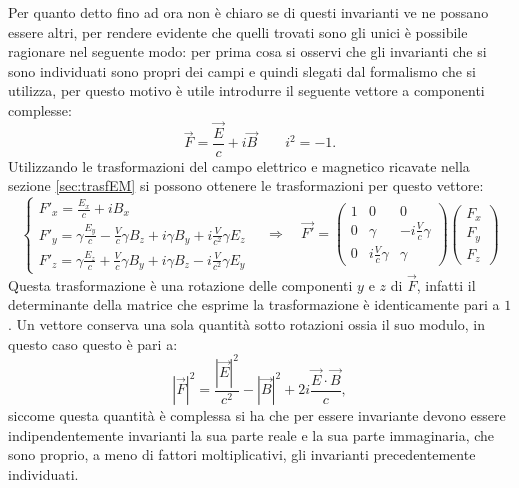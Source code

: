 Per quanto detto fino ad ora non è chiaro se di questi invarianti ve ne possano essere altri, per rendere evidente che quelli trovati sono gli unici è possibile ragionare nel seguente modo: per prima cosa si osservi che gli invarianti che si sono individuati sono propri dei campi e quindi slegati dal formalismo che si utilizza, per questo motivo è utile introdurre il seguente vettore a componenti complesse:
\begin{equation*}
    \vec{F}=\frac{\vec E}{c} +i\vec B \qquad i^2=-1.
\end{equation*}
Utilizzando le trasformazioni del campo elettrico e magnetico ricavate nella sezione \ref{sec:trasfEM} si possono ottenere le trasformazioni per questo vettore:
\begin{equation*}
    \begin{cases}
        F'_x=\frac{E_x}{c}+iB_x\\
        F'_y=\gamma\frac{E_y}{c}-\frac{V}{c}\gamma B_z+i\gamma B_y+i\frac{V}{c^2}\gamma E_z\\
        F'_z=\gamma\frac{E_z}{c}+\frac{V}{c}\gamma B_y+i\gamma B_z-i\frac{V}{c^2}\gamma E_y
    \end{cases}
    \quad\Rightarrow\quad
    \vec{F'}=\begin{pmatrix}
        1&0&0\\
        0&\gamma&-i\frac{V}{c}\gamma\\
        0&i\frac{V}{c}\gamma&\gamma
    \end{pmatrix}
    \begin{pmatrix}
        F_x\\F_y\\F_z
    \end{pmatrix}
\end{equation*}
Questa trasformazione è una rotazione delle componenti $y$ e $z$ di $\vec{F}$, infatti il determinante della matrice che esprime la trasformazione è identicamente pari a $1$. Un vettore conserva una sola quantità sotto rotazioni ossia il suo modulo, in questo caso questo è pari a:
\begin{equation*}
    |\vec F|^2=\frac{|\vec E|^2}{c^2}-|\vec B|^2+2i\frac{\vec E\cdot\vec B}{c},
\end{equation*}
siccome questa quantità è complessa si ha che per essere invariante devono essere indipendentemente invarianti la sua parte reale e la sua parte immaginaria, che sono proprio, a meno di fattori moltiplicativi, gli invarianti precedentemente individuati.